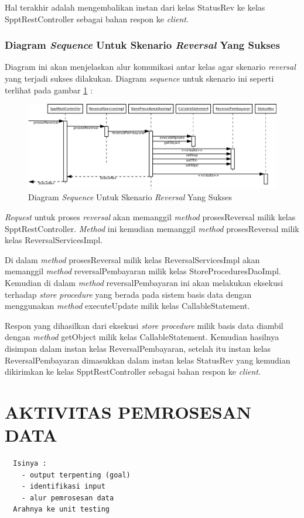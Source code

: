 \documentclass[pdftex,12pt, oneside]{article}
\begin{document}
Hal terakhir adalah mengembalikan instan dari kelas StatusRev ke kelas SpptRestController sebagai bahan respon ke \textit{client}.

\subsubsection{Diagram \textit{Sequence} Untuk Skenario \textit{Reversal} Yang Sukses}

Diagram ini akan menjelaskan alur komunikasi antar kelas agar skenario \textit{reversal} yang terjadi sukses dilakukan. Diagram \textit{sequence} untuk skenario ini seperti terlihat pada gambar \ref{fig:uml-seq-rev} :

\begin{figure}[H]
  \centering
  \includegraphics[width=1\textwidth]{./resources/uml/uml-seq-rev}
  \caption{Diagram \textit{Sequence} Untuk Skenario \textit{Reversal} Yang Sukses}
  \label{fig:uml-seq-rev}
\end{figure}

\textit{Request} untuk proses \textit{reversal} akan memanggil \textit{method} prosesReversal milik kelas SpptRestController. \textit{Method} ini kemudian memanggil \textit{method} prosesReversal milik kelas ReversalServicesImpl.

Di dalam \textit{method} prosesReversal milik kelas ReversalServicesImpl akan memanggil \textit{method} reversalPembayaran milik kelas StoreProceduresDaoImpl. Kemudian di dalam \textit{method} reversalPembayaran ini akan melakukan eksekusi terhadap \textit{store procedure} yang berada pada sistem basis data dengan menggunakan \textit{method} executeUpdate milik kelas CallableStatement.

Respon yang dihasilkan dari eksekusi \textit{store procedure} milik basis data diambil dengan \textit{method} getObject milik kelas CallableStatement. Kemudian hasilnya disimpan dalam instan kelas ReversalPembayaran, setelah itu instan kelas ReversalPembayaran dimasukkan dalam instan kelas StatusRev yang kemudian dikirimkan ke kelas SpptRestController sebagai bahan respon ke \textit{client}.

\section{AKTIVITAS PEMROSESAN DATA}


\begin{verbatim}
  Isinya :
    - output terpenting (goal)
    - identifikasi input 
    - alur pemrosesan data
  Arahnya ke unit testing
\end{verbatim}
\end{document}
